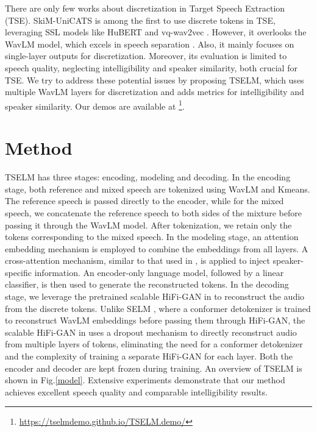 \documentclass[conference]{IEEEtran}
\begin{document}
There are only few works about discretization in Target Speech Extraction (TSE). SkiM-UniCATS \cite{gen_tse} is among the first to use discrete tokens in TSE, leveraging SSL models like HuBERT and vq-wav2vec \cite{vq_wav2vec}. However, it overlooks the WavLM model, which excels in speech separation \cite{wavlm}. Also, it mainly focuses on single-layer outputs for discretization. Moreover, its evaluation is limited to speech quality, neglecting intelligibility and speaker similarity, both crucial for TSE. We try to address these potential issues by proposing TSELM, which uses multiple WavLM layers for discretization and adds metrics for intelligibility and speaker similarity. Our demos are available at 
\footnote{\href{https://tselmdemo.github.io/TSELM.demo/}{https://tselmdemo.github.io/TSELM.demo/}}.


\section{Method}
TSELM has three stages: encoding, modeling and decoding. In the encoding stage, both reference and mixed speech are tokenized using WavLM and Kmeans. The reference speech is passed directly to the encoder, while for the mixed speech, we concatenate the reference speech to both sides of the mixture before passing it through the WavLM model. After tokenization, we retain only the tokens corresponding to the mixed speech.
In the modeling stage, an attention embedding mechanism is employed to combine the embeddings from all layers. A cross-attention mechanism, similar to that used in \cite{usef_tes}, is applied to inject speaker-specific information. An encoder-only language model, followed by a linear classifier, is then used to generate the reconstructed tokens.
In the decoding stage, we leverage the pretrained scalable HiFi-GAN in \cite{unit_hifi} to reconstruct the audio from the discrete tokens. Unlike SELM \cite{selm}, where a conformer detokenizer is trained to reconstruct WavLM embeddings before passing them through HiFi-GAN, the scalable HiFi-GAN in \cite{unit_hifi} uses a dropout mechanism to directly reconstruct audio from multiple layers of tokens, eliminating the need for a conformer detokenizer and the complexity of training a separate HiFi-GAN for each layer. Both the encoder and decoder are kept frozen during training. An overview of TSELM is shown in Fig.\ref{model}.
Extensive experiments demonstrate that our method achieves excellent speech quality and comparable intelligibility results.
\end{document}
